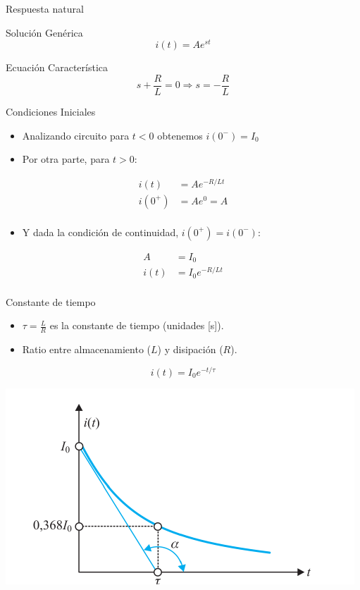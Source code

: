 \documentclass[aspectratio=169, usenames,svgnames,dvipsnames]{beamer}
\begin{document}
\begin{frame}[label={sec:org13072b8}]{Respuesta natural}
\begin{block}{Solución Genérica}
\[
  i(t) = A e^{st}
\]
\end{block}

\begin{block}{Ecuación Característica}
\[
  s + \frac{R}{L} = 0 \Rightarrow s = -\frac{R}{L}
\]
\end{block}
\end{frame}

\begin{frame}[label={sec:orgdf219c8}]{Condiciones Iniciales}
\begin{itemize}
\item Analizando circuito para \(t < 0\) obtenemos  \(i(0^-) = I_0\)
\item Por otra parte, para \(t > 0\):
\end{itemize}
\begin{align*}
  i(t) &= A e^{-R/L t}\\
  i(0^+) &= A e^0 = A\\
\end{align*}

\begin{itemize}
\item Y dada la condición de continuidad, \(i(0^+) = i(0^-)\):
\end{itemize}
\begin{align*}
  A &= I_0\\
  i(t) &= I_0 e^{-R/L t}\\
\end{align*}
\end{frame}


\begin{frame}[label={sec:org6c178d8}]{Constante de tiempo}
\begin{itemize}
\item \(\tau = \frac{L}{R}\) es la constante de tiempo (unidades [s]).
\item Ratio entre almacenamiento (\(L\)) y disipación (\(R\)).
\end{itemize}

\[
  i(t) = I_0 e^{-t/\tau}  
\]
\begin{center}
\includegraphics[height=0.5\textheight]{../figs/RespuestaNatural_RL.pdf}
\end{center}
\end{frame}
\end{document}
